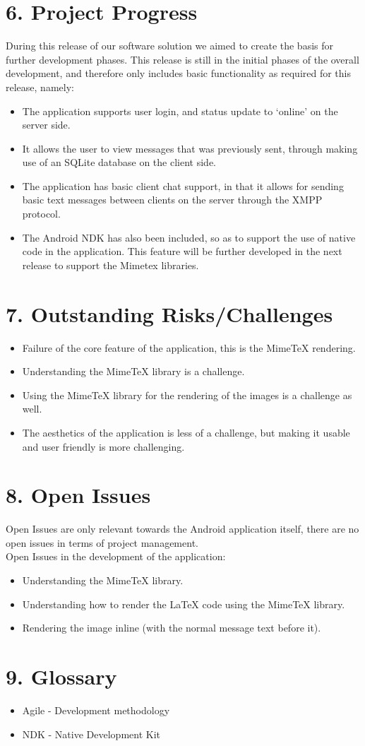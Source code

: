 \documentclass[29pt,a4paper]{moderncv}
\begin{document}
\newpage
		\section*{6. Project Progress}
		During this release of our software solution we aimed to create the basis for further development phases.  This release is still in the initial phases of the overall development, and therefore only includes basic functionality as required for this release, namely:
		
		\begin{itemize}
			\item The application supports user login, and status update to ‘online’ on the server side.
			\item It allows the user to view messages that was previously sent, through making use of an SQLite database on the client side.
			\item The application has basic client chat support, in that it allows for sending basic text messages between clients on the server through the XMPP protocol.
			\item The Android NDK has also been included, so as to support the use of native code in the application.  This feature will be further developed in the next release to support the Mimetex libraries.	
		\end{itemize}

\newpage
		\section*{7. Outstanding Risks/Challenges}
		\begin{itemize}
			\item Failure of the core feature of the application, this is the MimeTeX rendering.
			\item Understanding the MimeTeX library is a challenge.
			\item Using the MimeTeX library for the rendering of the images is a challenge as well.
			\item The aesthetics of the application is less of a challenge, but making it usable and user friendly is more challenging.
			
		\end{itemize}
\newpage		
		\section*{8. Open Issues}
		Open Issues are only relevant towards the Android application itself, there are no open issues in terms of project management.\\
		Open Issues in the development of the application:
				\begin{itemize}
					\item Understanding the MimeTeX library.
					\item Understanding how to render the LaTeX code using the MimeTeX library.
					\item Rendering the image inline (with the normal message text before it).
					
				\end{itemize}	
\newpage
		\section*{9. Glossary}
		\begin{itemize}
			\item Agile - Development methodology
			\item NDK - Native Development Kit
		\end{itemize}
\end{document}
